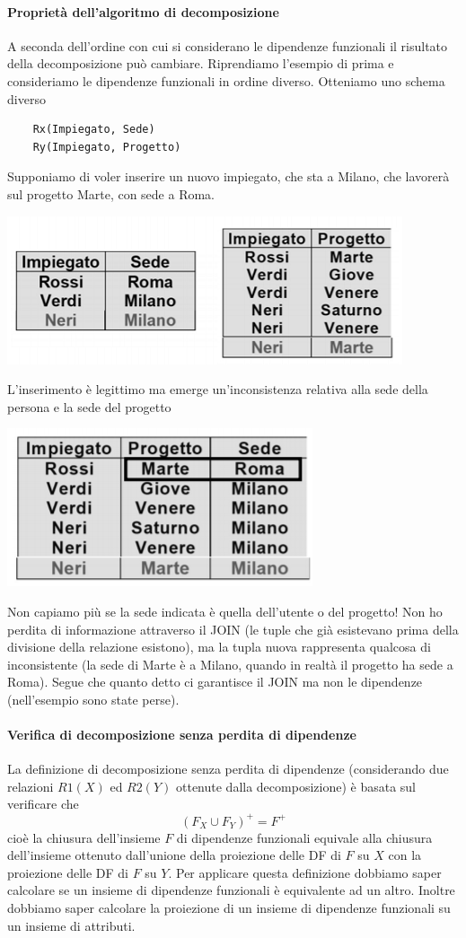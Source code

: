 \paragraph{Proprietà dell'algoritmo di decomposizione} A seconda dell'ordine con cui si considerano le dipendenze funzionali il risultato della decomposizione può cambiare. Riprendiamo l'esempio di prima e consideriamo le dipendenze funzionali in ordine diverso. Otteniamo uno schema diverso
\begin{verbatim}
	Rx(Impiegato, Sede)
	Ry(Impiegato, Progetto)
\end{verbatim}Supponiamo di voler inserire un nuovo impiegato, che sta a Milano, che lavorerà sul progetto Marte, con sede a Roma. 
\begin{center}
	\includegraphics{images/150.PNG}
\end{center}L'inserimento è legittimo ma emerge un'inconsistenza relativa alla sede della persona e la sede del progetto
\begin{center}
	\includegraphics{images/146.PNG}
\end{center}
Non capiamo più se la sede indicata è quella dell'utente o del progetto! Non ho perdita di informazione attraverso il JOIN (le tuple che già esistevano prima della divisione della relazione esistono), ma la tupla nuova rappresenta qualcosa di inconsistente (la sede di Marte è a Milano, quando in realtà il progetto ha sede a Roma).  Segue che quanto detto ci garantisce il JOIN ma non le dipendenze (nell'esempio sono state perse).
\paragraph{Verifica di decomposizione senza perdita di dipendenze} La definizione di decomposizione senza perdita di dipendenze (considerando due relazioni $R1(X)$ ed $R2(Y)$ ottenute dalla decomposizione) è basata sul verificare che
\[(F_X \cup F_Y)^+=F^+\]
cioè la chiusura dell'insieme $F$ di dipendenze funzionali equivale alla chiusura dell'insieme ottenuto dall'unione della proiezione delle DF di $F$ su $X$ con la  proiezione delle DF di $F$ su $Y$. 
Per applicare questa definizione dobbiamo saper calcolare se un insieme di dipendenze funzionali è equivalente ad un altro. Inoltre dobbiamo saper calcolare la proiezione di un insieme di dipendenze funzionali su un insieme di attributi.
